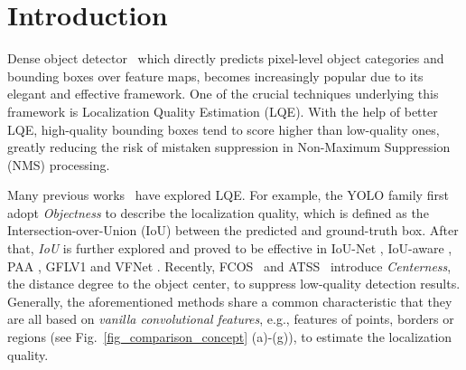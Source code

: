 \documentclass[10pt,twocolumn,letterpaper]{article}
\begin{document}
\section{Introduction}
Dense object detector~\cite{redmon2016you,liu2016ssd,zhou2019objects,tian2019fcos,li2020generalized,qiu2020borderdet} which directly predicts pixel-level object categories and bounding boxes 
over feature maps, 
becomes increasingly popular due to its elegant and effective 
framework.
One of the crucial techniques underlying this framework is Localization Quality Estimation (LQE).
With the help of better LQE, high-quality bounding boxes tend to score higher than low-quality ones, greatly reducing the risk of mistaken suppression in Non-Maximum Suppression (NMS) processing.



\iffalse
\begin{figure*}[t]
	\begin{center}
		\setlength{\fboxrule}{0pt}
\fbox{\texttt{[image: ./figs/distribution\_quality\_cropped.pdf]}}
	\end{center}	
	\captionsetup{font={small}}
	\vspace{-20pt}
	\caption{Motivation of utilizing the highly relevant statistics of learned bounding box distributions to guide the better generation of its estimated localization quality. The sharp distribution corresponds to higher quality, whilst the flat one stands for lower quality usually. Green: predicted bounding boxes; White: ground-truth bounding boxes.}
	\label{fig_distribution_quality_cropped}
	\vspace{-10pt}
\end{figure*}
\fi

Many previous works~\cite{redmon2016you,redmon2017yolo9000,redmon2018yolov3,tian2019fcos,zhang2019bridging,wu2020iou,kim2020probabilistic,li2020generalized,zhang2020varifocalnet,zhu2020autoassign,qiu2020borderdet} have explored LQE.
For example,
the YOLO family \cite{redmon2016you,redmon2017yolo9000,redmon2018yolov3} first adopt \emph{Objectness} to describe the localization quality, which is defined as the Intersection-over-Union (IoU) between the predicted and ground-truth box.
After that, \emph{IoU} is further explored and proved to be effective in IoU-Net \cite{jiang2018acquisition}, IoU-aware \cite{wu2020iou}, PAA \cite{kim2020probabilistic}, GFLV1 \cite{li2020generalized} and VFNet \cite{zhang2020varifocalnet}.
Recently, FCOS~\cite{tian2019fcos} and ATSS~\cite{zhang2019bridging} introduce
\emph{Centerness}, the distance degree to the object center, to suppress low-quality detection results. 
Generally, the aforementioned methods share a common characteristic that they are all based on \emph{vanilla convolutional
features}, e.g., features of points, borders or regions (see Fig.~\ref{fig_comparison_concept} (a)-(g)), to estimate the localization quality. 
\end{document}
